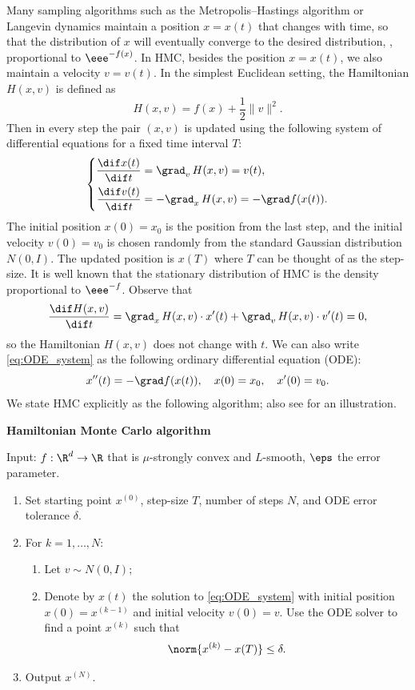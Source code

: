 Many sampling algorithms such as the Metropolis--Hastings algorithm or Langevin dynamics maintain a position $x=x(t)$ that changes with time, so that the distribution of $x$ will eventually converge to the desired distribution, \ie, proportional to $\eee^{-f(x)}$.  
In HMC, besides the position $x=x(t)$, we also maintain a velocity $v=v(t)$. In the simplest Euclidean setting, the Hamiltonian $H(x,v)$ is defined as
\begin{equation}
%
H(x,v) = f(x) + \frac{1}{2} \|v\|^2.
\end{equation}
Then in every step the pair $(x,v)$ is updated using the following system of differential equations for a fixed time interval $T$:
\begin{equation}\label{eq:ODE_system}
\left\{
\begin{aligned}
\frac{\dif x(t)}{\dif t} &= \grad_v\, H(x,v)
%
= v(t),\\
\frac{\dif v(t)}{\dif t} &= -\grad_x\, H(x,v)
%
= -\grad f(x(t)).
\end{aligned}
\right.
\end{equation}
The initial position $x(0) = x_0$ is the position from the last step, and the initial velocity $v(0) = v_0$ is chosen randomly from the standard Gaussian distribution $N(0,I)$. The updated position is $x(T)$ where $T$ can be thought of as the step-size. 
It is %
well known  %
that the stationary distribution of HMC is the density proportional
to $\eee^{-f}$. 
Observe that 
\[
\frac{\dif H(x,v)}{\dif t} = 
%
\grad_x\, H(x,v) \cdot x'(t) + 
%
\grad_v\, H(x,v) \cdot v'(t) = 0, 
\] 
so the Hamiltonian $H(x,v)$ does not change with $t$. 
We can also write \eqref{eq:ODE_system} as the following ordinary differential equation (ODE):
\begin{equation}\label{eq:ODE_Ham}
x''(t) = -\grad f(x(t)), \quad x(0) = x_0, \quad x'(0) = v_0.
\end{equation}
We state HMC explicitly as the following algorithm; also see 
 for an illustration.

\bigskip

\noindent
\textbf{Hamiltonian Monte Carlo algorithm}

\medskip
Input: $f:\R^d \to \R$ that is $\mu$-strongly convex and $L$-smooth, $\eps$ the error parameter.
\begin{enumerate}
	\item Set starting point $x^{(0)}$, step-size $T$, number of steps $N$, and ODE error tolerance $\delta$.
	\item For $k=1,\dots,N$:
	\begin{enumerate}
		\item Let $v \sim N(0,I)$;
		\item Denote by $x(t)$ the solution to \eqref{eq:ODE_system} with initial position $x(0) = x^{(k-1)}$ and initial velocity $v(0) = v$. Use the ODE solver to find a point $x^{(k)}$ such that
		\[
		\norm{x^{(k)} - x(T)} \le \delta.
		\] 
	\end{enumerate}
	\item Output $x^{(N)}$. 
\end{enumerate}

